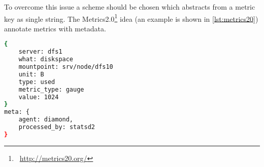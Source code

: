 To overcome this issue a scheme should be chosen which abstracts from a metric key as single string.
The Metrics2.0\footnote{\Mundus~\url{http://metrics20.org/}} idea (an example is shown in \autoref{lst:metrics20}) annotate metrics with metadata.

\begin{lstlisting}[language=bash,
    caption={Metrics2.0 formatted metric},
    label={lst:metrics20}]
{
    server: dfs1
    what: diskspace
    mountpoint: srv/node/dfs10
    unit: B
    type: used
    metric_type: gauge
    value: 1024
}
meta: {
    agent: diamond,
    processed_by: statsd2
}
\end{lstlisting}
